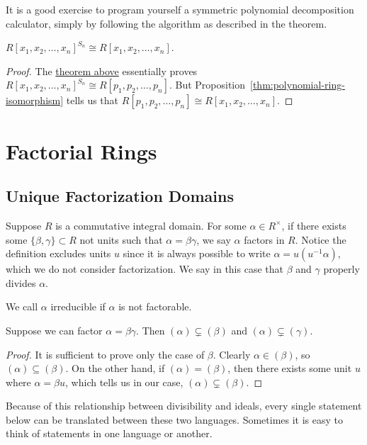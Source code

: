 \begin{remark}
    It is a good exercise to program yourself
    a symmetric polynomial decomposition calculator,
    simply by following the algorithm as described in the theorem.
\end{remark}
\begin{corollary}
    \({R[x_1,x_2,\hdots,x_n]}^{S_n} \cong R[x_1,x_2,\hdots,x_n]\).
\end{corollary}
\begin{proof}
    The \hyperref[thm:fundamental-sym-polynomial]{theorem above}
    essentially proves \({R[x_1,x_2,\hdots,x_n]}^{S_n} \cong R[p_1,p_2,\hdots,p_n]\).
    But Proposition~\ref{thm:polynomial-ring-isomorphism}
    tells us that \(R[p_1,p_2,\hdots,p_n] \cong R[x_1,x_2,\hdots,x_n]\).
\end{proof}


\section{Factorial Rings}\label{sec:factorial-rings}

\subsection*{Unique Factorization Domains}

\begin{definition}
    Suppose \(R\) is a commutative integral domain.
    For some \(\alpha \in R^\times\),
    if there exists some \(\{\beta,\gamma\} \subset R\) not units
    such that \(\alpha = \beta\gamma\),
    we say \(\alpha\) factors in \(R\).
    Notice the definition excludes units \(u\)
    since it is always possible to write \(\alpha = u(u^{-1}\alpha)\),
    which we do not consider factorization.
    We say in this case that \(\beta\) and \(\gamma\) properly divides \(\alpha\).
\end{definition}
\begin{definition}
    We call \(\alpha\) irreducible if \(\alpha\) is not factorable.
\end{definition}
\begin{proposition}
    Suppose we can factor \(\alpha = \beta\gamma\).
    Then \((\alpha) \subsetneq (\beta)\) and \((\alpha) \subsetneq (\gamma)\).
\end{proposition}
\begin{proof}
    It is sufficient to prove only the case of \(\beta\).
    Clearly \(\alpha \in (\beta)\), so \((\alpha) \subseteq (\beta)\).
    On the other hand, if \((\alpha) = (\beta)\),
    then there exists some unit \(u\) where \(\alpha = \beta u\),
    which tells us in our case, \((\alpha) \subsetneq (\beta)\).
\end{proof}
\begin{remark}
    Because of this relationship between divisibility and ideals,
    every single statement below
    can be translated between these two languages.
    Sometimes it is easy to think of statements in one language or another.
\end{remark}

